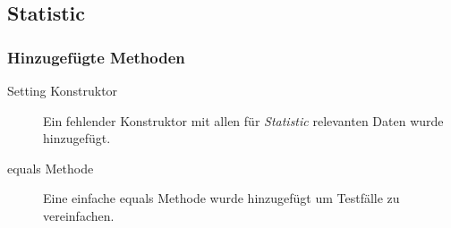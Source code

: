\subsection{Statistic}

\subsubsection{Hinzugefügte Methoden}
\begin{description}
\item[Setting Konstruktor]
Ein fehlender Konstruktor mit allen für \emph{Statistic} relevanten Daten wurde hinzugefügt.
\item[equals Methode]
Eine einfache equals Methode wurde hinzugefügt um Testfälle zu vereinfachen.
\end{description}







